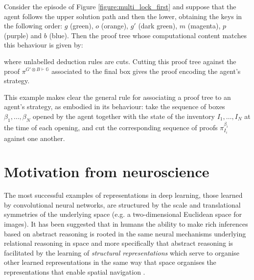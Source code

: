 \documentclass{article} %
\begin{document}
\begin{example} Consider the episode of Figure \ref{figure:multi_lock_first} and suppose that the agent follows the upper solution path and then the lower, obtaining the keys in the following order: $g$ (green), $o$ (orange), $g'$ (dark green), $m$ (magenta), $p$ (purple) and $b$ (blue). Then the proof tree whose computational content matches this behaviour is given by:
\be
\begin{mathprooftree}
\noLine{}
\noLine{}
\noLine{}
\noLine{}
\noLine{}
\noLine{}
\end{mathprooftree}
\ee
where unlabelled deduction rules are cuts. Cutting this proof tree against the proof $\pi^{G' \otimes B \vdash \mathbb{G}}$ associated to the final box gives the proof encoding the agent's strategy.
\end{example}

This example makes clear the general rule for associating a proof tree to an agent's strategy, as embodied in its behaviour: take the sequence of boxes $\beta_1, \ldots, \beta_N$ opened by the agent together with the state of the inventory $I_1, \ldots, I_N$ at the time of each opening, and cut the corresponding sequence of proofs $\pi^{\beta_i}_{I_i}$ against one another.


\section{Motivation from neuroscience}
\label{appendix:inductive_neuro}

The most successful examples of representations in deep learning, those learned by convolutional neural networks, are structured by the scale and translational symmetries of the underlying space (e.g. a two-dimensional Euclidean space for images). It has been suggested that in humans the ability to make rich inferences based on abstract reasoning is rooted in the same neural mechanisms underlying relational reasoning in space \citep{constantinescu,epstein,behrens,bellmund} and more specifically that abstract reasoning is facilitated by the learning of \emph{structural representations} which serve to organise other learned representations in the same way that space organises the representations that enable spatial navigation \citep{whittington,liu}. 
\end{document}
